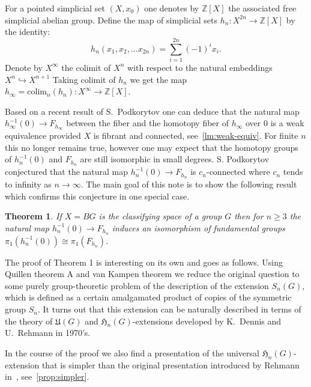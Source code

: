 \documentclass[oneside, 12pt]{amsart}
\theoremstyle{plain}
\newtheorem{thm}{Theorem}
\numberwithin{equation}{section}
\numberwithin{lemma}{section}
\theoremstyle{remark}
\theoremstyle{definition}
\newcommand{\ZZ}{\mathbb{Z}}
\begin{document}
For a pointed simplicial set $(X, x_0)$ one denotes by $\ZZ[X]$ the associated free simplicial abelian group.
Define the map of simplicial sets $h_n\colon X^{2n} \to \ZZ[X]$ by the identity:
 \[h_n(x_1, x_2, \ldots x_{2n}) = \sum\limits_{i=1}^{2n}(-1)^ix_i.\]
Denote by $X^\infty$ the colimit of $X^n$ with respect to the natural embeddings $X^{n} \hookrightarrow X^{n+1}$
Taking colimit of $h_n$ we get the map $h_\infty = \mathrm{colim}_n(h_n) \colon X^\infty \to \ZZ[X]$.

Based on a recent result of S.~Podkorytov one can deduce that the natural map $h^{-1}_\infty(0) \to F_{h_\infty}$
 between the fiber and the homotopy fiber of $h_\infty$ over $0$ is a weak equivalence provided $X$ is fibrant and connected, see~\cref{lm:weak-equiv}.
For finite $n$ this no longer remains true, however one may expect that the homotopy groups of $h^{-1}_n(0)$ and $F_{h_n}$ are still
 isomorphic in small degrees. %
S. Podkorytov conjectured that the natural map $h^{-1}_n(0) \to F_{h_n}$ is $c_n$-connected where $c_n$ tends to infinity as $n\to \infty$.
The main goal of this note is to show the following result which confirms this conjecture in one special case.
\begin{thm} \label{thm:main} If $X=BG$ is the classifying space of a group $G$ then for $n\geq 3$
 the natural map $h_n^{-1}(0) \to F_{h_n}$ induces an isomorphism of fundamental groups
 $\pi_1(h^{-1}_n(0))\cong \pi_1(F_{h_n})$. \end{thm}

The proof of Theorem 1 is interesting on its own and goes as follows. 
Using Quillen theorem A and van Kampen theorem we reduce the original question to some purely group-theoretic problem of 
 the description of the extension $S_n(G)$, which is defined as a certain amalgamated product of copies of the symmetric group $S_n$.
It turns out that this extension can be naturally described in terms of the theory of $\mathfrak{U}(G)$ 
 and $\mathfrak{H}_n(G)$-extensions developed by K.~Dennis and U.~Rehmann in 1970's.
 
In the course of the proof we also find a presentation of the universal $\mathfrak{H}_n(G)$-extension 
 that is simpler than the original presentation introduced by Rehmann in~\cite{Reh78}, see~\cref{prop:simpler}.
\end{document}
